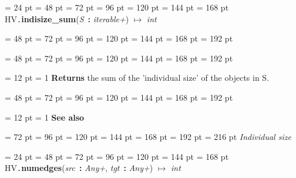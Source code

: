{{\par \noindent  \leftskip = 24 pt  \leftmargini = 48 pt  \leftmarginii = 72 pt  \leftmarginiii = 96 pt  \leftmarginiv = 120 pt  \leftmarginv = 144 pt  \leftmarginvi = 168 pt HV{\tt .\/}{\bf {\large {\bf indisize{\_}sum\/}}\/}({\em S\/}~{\bf :}  {\em iterable+\/}) \(\mapsto \)  {\em int\/}{\par \noindent
{\par \noindent  \leftskip = 48 pt  \leftmargini = 72 pt  \leftmarginii = 96 pt  \leftmarginiii = 120 pt  \leftmarginiv = 144 pt  \leftmarginv = 168 pt  \leftmarginvi = 192 pt {\par \noindent
\par}
\par}
{\par \noindent  \leftskip = 48 pt  \leftmargini = 72 pt  \leftmarginii = 96 pt  \leftmarginiii = 120 pt  \leftmarginiv = 144 pt  \leftmarginv = 168 pt  \leftmarginvi = 192 pt {\par \noindent
{\par \pagebreak[3.100000] \noindent \hangindent = 12 pt \hangafter = 1 
{\bf Returns \/} the sum of the 'individual size' of the objects in S.\par}
\par}
\par}
{\par \noindent  \leftskip = 48 pt  \leftmargini = 72 pt  \leftmarginii = 96 pt  \leftmarginiii = 120 pt  \leftmarginiv = 144 pt  \leftmarginv = 168 pt  \leftmarginvi = 192 pt {\par \noindent
{\par \pagebreak[3.100000] \noindent \hangindent = 12 pt \hangafter = 1 
{\bf See also\/}\par}
{\par \noindent  \leftskip = 72 pt  \leftmargini = 96 pt  \leftmarginii = 120 pt  \leftmarginiii = 144 pt  \leftmarginiv = 168 pt  \leftmarginv = 192 pt  \leftmarginvi = 216 pt   {\em  Individual size
\/}\par}
\par}
\par}
\par}
\par}
{\par \noindent  \leftskip = 24 pt  \leftmargini = 48 pt  \leftmarginii = 72 pt  \leftmarginiii = 96 pt  \leftmarginiv = 120 pt  \leftmarginv = 144 pt  \leftmarginvi = 168 pt HV{\tt .\/}{\bf {\large {\bf numedges\/}}\/}({\em src\/}~{\bf :}  {\em Any+\/}, {\em tgt\/}~{\bf :}  {\em Any+\/}) \(\mapsto \)  {\em int\/}{\par \noindent
}}}
